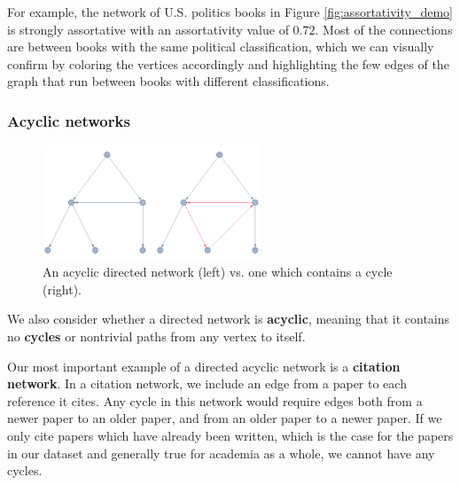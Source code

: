 \documentclass[12pt]{thesis}
\theoremstyle{plain}
\theoremstyle{definition}
\theoremstyle{remark}
\begin{document}
For example, the network of U.S. politics books in Figure \ref{fig:assortativity_demo} is strongly assortative with an assortativity value of $0.72$. Most of the connections are between books with the same political classification, which we can visually confirm by coloring the vertices accordingly and highlighting the few edges of the graph that run between books with different classifications.

\subsubsection{Acyclic networks}

\begin{figure}[h]
\centering
\includegraphics[width=0.58\textwidth]{acyclic_demo.png}
\caption{An acyclic directed network (left) vs. one which contains a cycle (right).}
\label{fig:acyclic_demo}
\end{figure}

We also consider whether a directed network is \textbf{acyclic}, meaning that it contains no \textbf{cycles} or nontrivial paths from any vertex to itself.

Our most important example of a directed acyclic network is a \textbf{citation network}. In a citation network, we include an edge from a paper to each reference it cites. Any cycle in this network would require edges both from a newer paper to an older paper, and from an older paper to a newer paper. If we only cite papers which have already been written, which is the case for the papers in our dataset and generally true for academia as a whole, we cannot have any cycles. 








\end{document}
